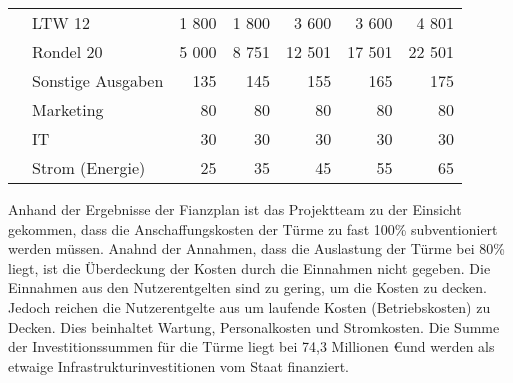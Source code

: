 \begin{table}[H]
\begin{tabular}{llrrrrr}
                                                                                 & LTW 12                      & 1 800         & 1 800         & 3 600         & 3 600         & 4 801  \\
                                                                                 & Rondel 20                   & 5 000         & 8 751         & 12 501        & 17 501        & 22 501 \\
    \midrule
                                                                                 & Sonstige Ausgaben           & 135           & 145           & 155           & 165           & 175    \\
                                                                                 & Marketing                   & 80            & 80            & 80            & 80            & 80     \\
                                                                                 & IT                          & 30            & 30            & 30            & 30            & 30     \\
                                                                                 & Strom (Energie)             & 25            & 35            & 45            & 55            & 65     \\
    \bottomrule
  \end{tabular}
\end{table}

Anhand der Ergebnisse der Fianzplan ist das Projektteam zu der Einsicht gekommen, dass die Anschaffungskosten der Türme zu fast 100\% subventioniert werden müssen. Anahnd der Annahmen, dass die Auslastung der Türme bei 80\% liegt, ist die Überdeckung der Kosten durch die Einnahmen nicht gegeben. Die Einnahmen aus den Nutzerentgelten sind zu gering, um die Kosten zu decken. Jedoch reichen die Nutzerentgelte aus um laufende Kosten (Betriebskosten) zu Decken. Dies beinhaltet Wartung, Personalkosten und Stromkosten. Die Summe der Investitionssummen für die Türme liegt bei 74,3 Millionen \euro und werden als etwaige Infrastrukturinvestitionen vom Staat finanziert.
